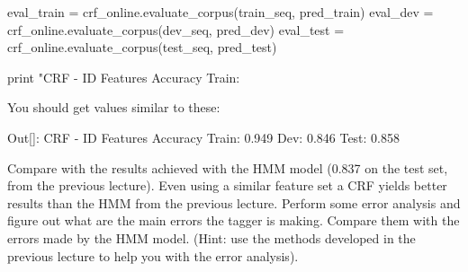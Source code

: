 \begin{exercise}
\begin{python}
eval_train = crf_online.evaluate_corpus(train_seq, pred_train)
eval_dev = crf_online.evaluate_corpus(dev_seq, pred_dev)
eval_test = crf_online.evaluate_corpus(test_seq, pred_test)

print "CRF - ID Features Accuracy Train: %
\end{python}

You should get values similar to these:
\begin{python}
Out[]: CRF - 
ID Features Accuracy Train: 0.949 Dev: 0.846 Test: 0.858
\end{python}
\end{exercise}

Compare with the results achieved with the HMM model (0.837 on the test set, from the previous lecture). Even using a similar feature set a CRF yields better
results than the HMM from the previous lecture. 
Perform some error analysis and figure out what are the main
errors the tagger is making. Compare them with the errors made
by the HMM model. (Hint: use the methods developed in the previous
lecture to help you with the error analysis).


